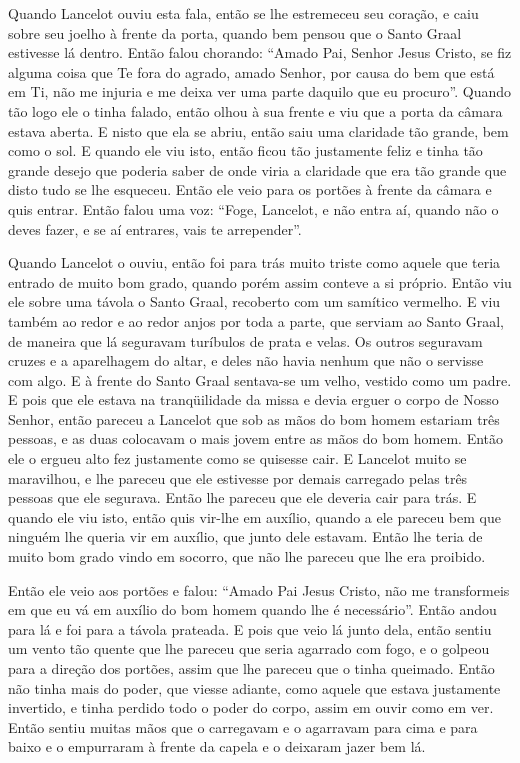  Quando Lancelot ouviu esta fala, então se lhe estremeceu seu coração, e caiu
sobre seu joelho à frente da porta, quando bem pensou que o Santo Graal
estivesse lá dentro. Então falou chorando: “Amado Pai, Senhor Jesus Cristo, se
fiz alguma coisa que Te fora do agrado, amado Senhor, por causa do bem que está
em Ti, não me injuria e me deixa ver uma parte daquilo que eu procuro”. Quando
tão logo ele o tinha falado, então olhou à sua frente e viu que a porta da
câmara estava aberta. E nisto que ela se abriu, então saiu uma claridade tão
grande, bem como o sol. E quando ele viu isto, então ficou tão justamente feliz
e tinha tão grande desejo que poderia saber de onde viria a claridade que era
tão grande que disto tudo se lhe esqueceu. Então ele veio para os portões à
frente da câmara e quis entrar. Então falou uma voz: “Foge, Lancelot, e não
entra aí, quando não o deves fazer, e se aí entrares, vais te arrepender”. 

Quando Lancelot o ouviu, então foi para trás muito triste como aquele que teria
entrado de muito bom grado, quando porém assim conteve a si próprio. Então viu
ele sobre uma távola o Santo Graal, recoberto com um samítico vermelho. E viu
também ao redor e ao redor anjos por toda a parte, que serviam ao Santo Graal,
de maneira que lá seguravam turíbulos de prata e velas. Os outros seguravam
cruzes e a aparelhagem do altar, e deles não havia nenhum que não o servisse
com algo. E à frente do Santo Graal sentava-se um velho, vestido como um padre.
E pois que ele estava na tranqüilidade da missa e devia erguer o corpo de Nosso
Senhor, então pareceu a Lancelot que sob as mãos do bom homem estariam três
pessoas, e as duas colocavam o mais jovem entre as mãos do bom homem. Então ele
o ergueu alto fez justamente como se quisesse cair. E Lancelot muito se
maravilhou, e lhe pareceu que ele estivesse por demais carregado pelas três
pessoas que ele segurava. Então lhe pareceu que ele deveria cair para trás. E
quando ele viu isto, então quis vir-lhe em auxílio, quando a ele pareceu bem
que ninguém lhe queria vir em auxílio, que junto dele estavam. Então lhe teria
de muito bom grado vindo em socorro, que não lhe pareceu que lhe era proibido. 

Então ele veio aos portões e falou: “Amado Pai Jesus Cristo, não me transformeis
em que eu vá em auxílio do bom homem quando lhe é necessário”. Então andou para
lá e foi para a távola prateada. E pois que veio lá junto dela, então sentiu um
vento tão quente que lhe pareceu que seria agarrado com fogo, e o golpeou para
a direção dos portões, assim que lhe pareceu que o tinha queimado. Então não 
tinha mais do poder, que viesse adiante, como aquele que estava
justamente invertido, e tinha perdido todo o poder do corpo, assim em ouvir
como em ver. Então sentiu muitas mãos que o carregavam e o agarravam para cima
e para baixo e o empurraram à frente da capela e o deixaram jazer bem lá. 

